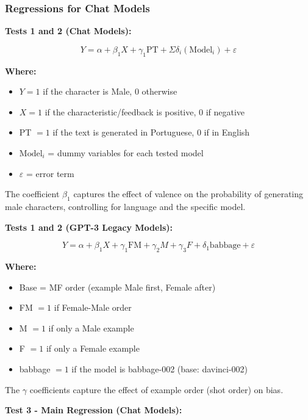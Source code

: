 \documentclass[jair,11pt,letterpaper]{article}
\begin{document}
\subsubsection{Regressions for Chat Models}


\textbf{Tests 1 and 2 (Chat Models):}

\begin{equation}
Y = \alpha + \beta_1 X + \gamma_1 \text{PT} + \Sigma\delta_i(\text{Model}_i) + \varepsilon
\end{equation}

\textbf{Where:}
\begin{itemize}
\item $Y = 1$ if the character is Male, 0 otherwise
\item $X = 1$ if the characteristic/feedback is positive, 0 if negative
\item PT $= 1$ if the text is generated in Portuguese, 0 if in English
\item $\text{Model}_i$ = dummy variables for each tested model
\item $\varepsilon$ = error term
\end{itemize}

The coefficient $\beta_1$ captures the effect of valence on the probability of
generating male characters, controlling for language and the specific
model.

\textbf{Tests 1 and 2 (GPT-3 Legacy Models):}

\begin{equation}
Y = \alpha + \beta_1 X + \gamma_1 \text{FM} + \gamma_2 M + \gamma_3 F + \delta_1 \text{babbage} + \varepsilon
\end{equation}

\textbf{Where:}
\begin{itemize}
\item Base = MF order (example Male first, Female after)
\item FM $= 1$ if Female-Male order
\item M $= 1$ if only a Male example
\item F $= 1$ if only a Female example
\item babbage $= 1$ if the model is babbage-002 (base: davinci-002)
\end{itemize}

The $\gamma$ coefficients capture the effect of example order (shot order)
on bias.

\par\medskip\noindent
\textbf{Test 3 - Main Regression (Chat Models):}
\end{document}
